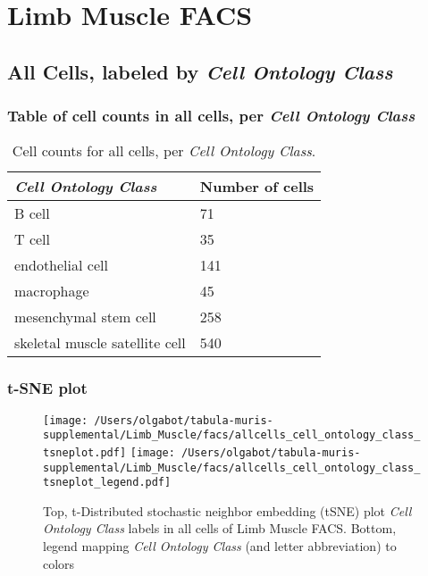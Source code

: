 \clearpage
\section{Limb Muscle FACS}

\subsection{All Cells, labeled by \emph{Cell Ontology Class}}
\subsubsection{Table of cell counts in all cells, per \emph{Cell Ontology Class}}\begin{table}[h]
\centering
\label{my-label}
\begin{tabular}{@{}ll@{}}
\toprule

\emph{Cell Ontology Class}& Number of cells \\ \midrule
B cell & 71 \\

T cell & 35 \\

endothelial cell & 141 \\

macrophage & 45 \\

mesenchymal stem cell & 258 \\

skeletal muscle satellite cell & 540 \\
\bottomrule
\end{tabular}
\caption{Cell counts for all cells, per \emph{Cell Ontology Class}.}
\end{table}

\clearpage
\subsubsection{t-SNE plot}
\begin{figure}[h]
\centering
\texttt{[image: /Users/olgabot/tabula-muris-supplemental/Limb\_Muscle/facs/allcells\_cell\_ontology\_class\_tsneplot.pdf]}
\texttt{[image: /Users/olgabot/tabula-muris-supplemental/Limb\_Muscle/facs/allcells\_cell\_ontology\_class\_tsneplot\_legend.pdf]}
\caption{Top, t-Distributed stochastic neighbor embedding (tSNE) plot  \emph{Cell Ontology Class} labels in all cells of Limb Muscle FACS. Bottom, legend mapping \emph{Cell Ontology Class} (and letter abbreviation) to colors}
\end{figure}


